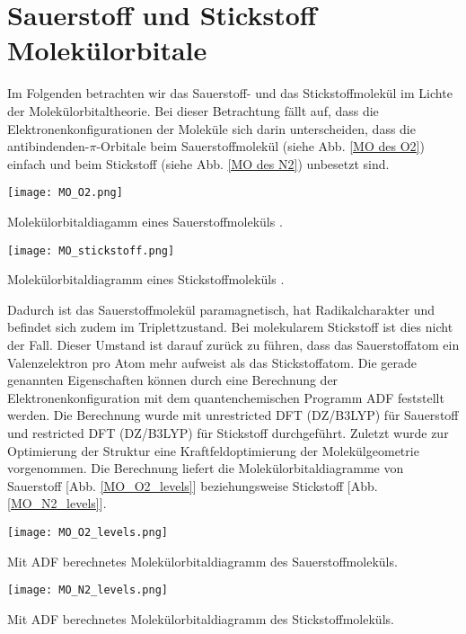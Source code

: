 \section{Sauerstoff und Stickstoff Molekülorbitale}

Im Folgenden betrachten wir das Sauerstoff- und das Stickstoffmolekül im Lichte
der Molekülorbitaltheorie. Bei dieser Betrachtung fällt auf, dass die
Elektronenkonfigurationen der Moleküle sich darin unterscheiden, dass die
antibindenden-$ \pi $-Orbitale beim Sauerstoffmolekül
(siehe Abb. \ref{MO des O2})
einfach und beim Stickstoff (siehe Abb. \ref{MO des N2}) unbesetzt sind.

\begin{dsafigure}
	\centering
	\texttt{[image: MO\_O2.png]}
	\caption{Molekülorbitaldiagamm eines Sauerstoffmoleküls \cite{MOO2}.}
	\label{MO des O2}
\end{dsafigure}

\begin{dsafigure}
	\centering
	\texttt{[image: MO\_stickstoff.png]}
	\caption{Molekülorbitaldiagramm eines Stickstoffmoleküls \cite{MON2}.}
	\label{MO des N2}
\end{dsafigure}

Dadurch ist das Sauerstoffmolekül paramagnetisch, hat Radikalcharakter und
befindet sich zudem im Triplettzustand. Bei molekularem Stickstoff ist dies
nicht der Fall. Dieser Umstand ist darauf zurück zu führen, dass das Sauerstoffatom ein Valenzelektron pro Atom mehr aufweist als das Stickstoffatom. Die gerade genannten Eigenschaften können durch eine Berechnung der Elektronenkonfiguration mit dem quantenchemischen Programm ADF \cite{ADF2017authors} feststellt werden. Die Berechnung wurde mit unrestricted DFT (DZ/B3LYP) für Sauerstoff und restricted DFT (DZ/B3LYP) für Stickstoff durchgeführt. Zuletzt wurde zur Optimierung der Struktur eine Kraftfeldoptimierung der Molekülgeometrie vorgenommen. Die Berechnung liefert die Molekülorbitaldiagramme von Sauerstoff [Abb. \ref{MO_O2_levels}] beziehungsweise Stickstoff [Abb. \ref{MO_N2_levels}].


\begin{dsafigure}
	\centering
	\texttt{[image: MO\_O2\_levels.png]}
	\caption{Mit ADF berechnetes Molekülorbitaldiagramm des Sauerstoffmoleküls.}
	\label{MO_O2_levels}
\end{dsafigure}

\begin{dsafigure}
	\centering
	\texttt{[image: MO\_N2\_levels.png]}
	\caption{Mit ADF berechnetes Molekülorbitaldiagramm des Stickstoffmoleküls.}
	\label{MO_N2_levels}
\end{dsafigure}
